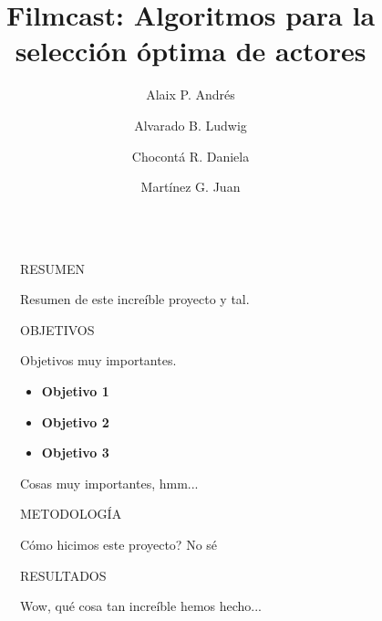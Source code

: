 \documentclass[final]{beamer}
\title{Filmcast: Algoritmos para la selección óptima de actores}
\author{Alaix P. Andrés \and Alvarado B. Ludwig \and Chocontá R. Daniela \and Martínez G. Juan  }
\newlength{\sepwidth}
\newlength{\colwidth}
\newcommand{\separatorcolumn}{\begin{column}{\sepwidth}\end{column}}
\begin{document}

\begin{frame}[t]
\begin{columns}[t]
\separatorcolumn

\begin{column}{\colwidth}

  \begin{block}{RESUMEN}

    Resumen de este increíble proyecto y tal.

  \end{block}

  \begin{block}{OBJETIVOS}

    Objetivos muy importantes.

    \begin{itemize}
      \item \textbf{Objetivo 1}
      \item \textbf{Objetivo 2}
      \item \textbf{Objetivo 3}
    \end{itemize}

    Cosas muy importantes, hmm...

  \end{block}

  \begin{alertblock}{METODOLOGÍA}

    Cómo hicimos este proyecto? No sé

  \end{alertblock}

 \begin{block}{RESULTADOS}

    Wow, qué cosa tan increíble hemos hecho...

  \end{block}

\end{column}

\separatorcolumn

\begin{column}{\colwidth}


\end{column}
\end{columns}
\end{frame}
\end{document}
